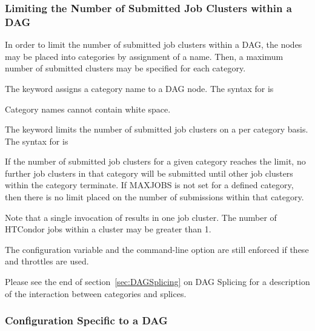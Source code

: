 \subsubsection{\label{sec:DAG-node-category}Limiting the Number of Submitted Job Clusters within a DAG}


In order to limit the number of submitted job clusters within a DAG,
the nodes may be placed into categories by assignment of a name.
Then, a maximum number of submitted clusters may be specified
for each category.

The  keyword assigns a category name to a DAG node.
The syntax for  is

  

Category names cannot contain white space.

The  keyword limits the number of submitted job clusters
on a per category basis.
The syntax for  is

  

If the number of submitted job clusters for a given category reaches the limit,
no further job clusters in that category will be submitted until other
job clusters within the category terminate.
If MAXJOBS is not set for a defined category,
then there is no limit placed on the number of submissions
within that category.

Note that a single invocation
of  results in one job cluster.
The number of HTCondor jobs within a cluster may be greater than 1. 

The  configuration variable  
and the   command-line option
are still enforced if these  and  throttles are used.

Please see the end of section~\ref{sec:DAGSplicing}
on DAG Splicing for a description of the interaction between
categories and splices.

\subsubsection{\label{sec:DAG-configuration}Configuration Specific to a DAG}

